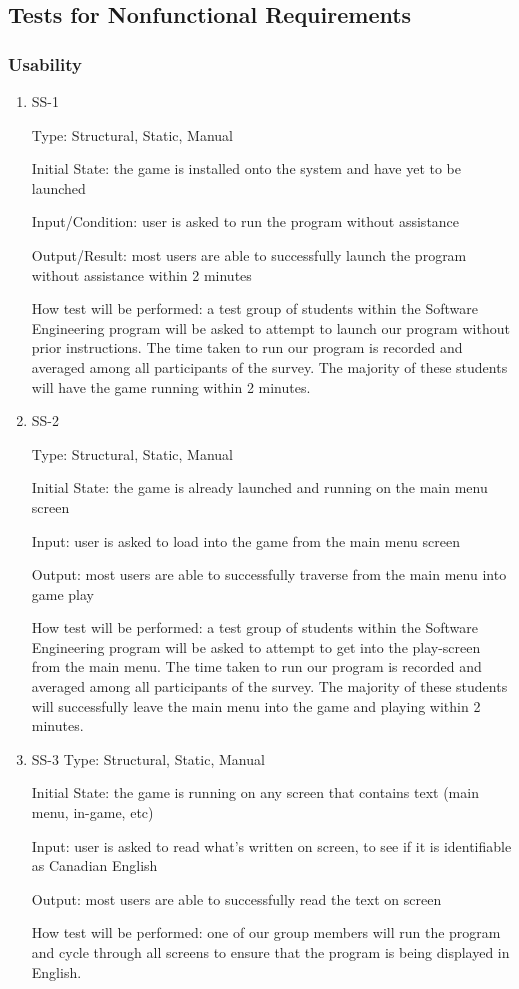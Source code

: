 \documentclass[12pt, titlepage]{article}
\begin{document}
\subsection{Tests for Nonfunctional Requirements}

\subsubsection{Usability}

\begin{enumerate}

\item{SS-1}

Type: Structural, Static, Manual
					
Initial State: the game is installed onto the system and have yet to be launched
					
Input/Condition: user is asked to run the program without assistance
					
Output/Result: most users are able to successfully launch the program without assistance within 2 minutes
					
How test will be performed: a test group of students within the Software Engineering program will be asked to attempt to launch our program without prior instructions. The time taken to run our program is recorded and averaged among all participants of the survey. The majority of these students will have the game running within 2 minutes.
					
\item{SS-2}

Type: Structural, Static, Manual
					
Initial State: the game is already launched and running on the main menu screen
					
Input: user is asked to load into the game from the main menu screen
					
Output: most users are able to successfully traverse from the main menu into game play
					
How test will be performed: a test group of students within the Software Engineering program will be asked to attempt to get into the play-screen from the main menu. The time taken to run our program is recorded and averaged among all participants of the survey. The majority of these students will successfully leave the main menu into the game and playing within 2 minutes.

\item{SS-3}
Type: Structural, Static, Manual
					
Initial State: the game is running on any screen that contains text (main menu, in-game, etc)
					
Input: user is asked to read what's written on screen, to see if it is identifiable as Canadian English 
					
Output: most users are able to successfully read the text on screen
					
How test will be performed: one of our group members will run the program and cycle through all screens to ensure that the program is being displayed in English.

\end{enumerate}
\end{document}
